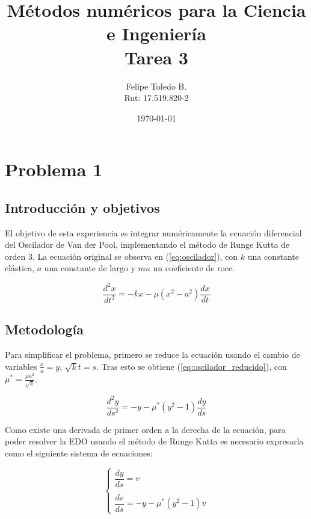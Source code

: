 \documentclass{article}
\title{M\'etodos num\'ericos para la Ciencia e Ingenier\'ia \\ Tarea 3} %
\author{Felipe Toledo B. \\ Rut: 17.519.820-2} %
\date{\today} %
\begin{document}
\maketitle %


\section{Problema 1}

\subsection{Introducci\'on y objetivos}

El objetivo de esta experiencia es integrar num\'ericamente la ecuaci\'on diferencial del Oscilador de Van der Pool, implementando el m\'etodo de Runge Kutta de orden 3. La ecuaci\'on original se observa en (\ref{eq:oscilador}), con $k$ una constante el\'astica, $a$ una constante de largo y $mu$ un coeficiente de roce.

\begin{equation}
  \dfrac{d^2x}{dt^2} = - k x - \mu (x^2 - a^2) \dfrac{dx}{dt}
  \label{eq:oscilador}
\end{equation}


\subsection{Metodolog\'ia}
Para simplificar el problema, primero se reduce la ecuaci\'on usando el cambio de variables $ \frac{x}{a} = y $, $\sqrt{k}t = s$. Tras esto se obtiene (\ref{eq:oscilador_reducido}), con $\mu^* = \frac{\mu a^2}{\sqrt{k}}$.

\begin{equation}
 \dfrac{d^2y}{ds^2} = - y - \mu^* (y^2 - 1) \dfrac{dy}{ds} 
 \label{eq:oscilador_reducido} 
\end{equation}
 
Como existe una derivada de primer orden a la derecha de la ecuaci\'on, para poder resolver la EDO usando el m\'etodo de Runge Kutta es necesario expresarla como el siguiente sistema de ecuaciones:

\begin{equation}
\begin{cases}

 \dfrac{dy}{ds} = v\\ \\
 \dfrac{dv}{ds} = -y - \mu^*(y^2 - 1)v

\end{cases} 
\label{eq:sistema_edos}
\end{equation}
\end{document}
